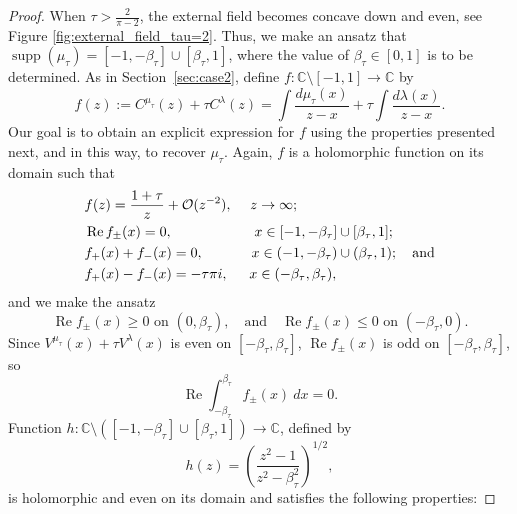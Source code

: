 \documentclass[reqno,11pt]{amsart}
\theoremstyle{plain}
\theoremstyle{definition}
\theoremstyle{remark}
\numberwithin{equation}{section}
\begin{document}
\begin{proof}
    When $\tau>\frac{2}{\pi-2}$, the external field becomes concave down and even, see Figure \ref{fig:external_field_tau=2}. Thus, we make an ansatz that $\operatorname{supp}(\mu_\tau)=[-1,-\beta_\tau]\cup[\beta_\tau,1]$, where the value of $\beta_\tau\in[0,1]$ is to be determined.
    As in Section~\ref{sec:case2}, define $f:\mathbb{C}\setminus[-1,1]\to\mathbb{C}$ by$$
    f(z):=C^{\mu_\tau}(z)+\tau C^\lambda(z)=\int\frac{ d{\mu_\tau}(x)}{z-x}+ \tau \int\frac{ d{\lambda}(x)}{z-x}.
    $$ 
    Our goal is to obtain an explicit expression for $f$ using the properties presented next, and in this way, to recover $\mu_\tau$. Again, $f$ is a holomorphic function on its domain such that
    \begin{align*}
        &f(z)=\frac{1+\tau}{z}+\mathcal O(z^{-2}),\hspace{0.44cm} z\to\infty;\\
        &\operatorname{Re}f_\pm(x)=0,\hspace{2.05cm}  x\in[-1,-\beta_\tau]\cup[\beta_\tau,1];\\
        &f_+(x)+f_-(x)=0,\hspace{1.2cm} x\in(-1,-\beta_\tau)\cup(\beta_\tau,1);\quad\text{and}\\
        &f_+(x)-f_-(x)=-\tau\pi i,\hspace{0.52cm} x\in(-\beta_\tau,\beta_\tau),
    \end{align*}
    and we make the ansatz
    \begin{equation*}
        \operatorname{Re} f_\pm(x)\geq0 \text{ on } (0,\beta_\tau),\quad \text{and} \quad \operatorname{Re} f_\pm(x)\leq0 \text{ on } (-\beta_\tau,0).\label{f_tau>2/(pi-2)_Re_f_sign_property}
    \end{equation*}
    Since $V^{\mu_\tau}(x)+\tau V^\lambda(x)$ is even on $[-\beta_\tau,\beta_\tau]$, $\operatorname{Re}f_\pm(x)$ is odd on $[-\beta_\tau,\beta_\tau]$, so
    \begin{equation*}\label{f_tau>2/(pi-2)_integral=0_property}
        \operatorname{Re}\int_{-\beta_\tau}^{\beta_\tau} f_\pm(x)\ dx=0.
    \end{equation*}
    \indent Function $h:\mathbb{C}\setminus([-1,-\beta_\tau]\cup[\beta_\tau,1])\to\mathbb{C}$, defined by
    \begin{equation*}
        h(z)=\left(\frac{z^2-1}{z^2-\beta_\tau^2}\right)^{1/2},
    \end{equation*}
    is holomorphic and even on its domain and satisfies the following properties:

\end{proof}
\end{document}
